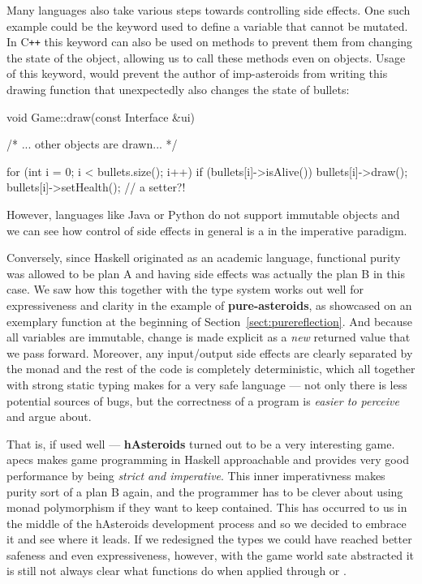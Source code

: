 \documentclass[
  digital, %
  color,   %
  table,   %
  oneside, %
  lof,     %
  lot,     %
]{fithesis3}
\newcommand{\cpp}{C\nolinebreak\texttt{+}\nolinebreak\texttt{+}}
\begin{document}
{Many languages also take various steps towards controlling side effects.
One such example could be the  keyword used to define a variable
that cannot be mutated. In \cpp{} this keyword can also be used on methods
to prevent them from changing the state of the object, allowing us to call these
methods even on  objects. Usage of this keyword, would prevent
the author of imp-asteroids from writing this drawing function that
unexpectedly also changes the state of bullets:
\begin{cppblock}
void Game::draw(const Interface &ui) {

    /* ... other objects are drawn... */
    
    for (int i = 0; i < bullets.size(); i++) {
        if (bullets[i]->isAlive()) {
            bullets[i]->draw();
            bullets[i]->setHealth(); // a setter?!
        }
    }
}
\end{cppblock}
However, languages like Java or Python do not support immutable objects
and we can see how control of side effects in general is a  in the imperative paradigm.

Conversely, since Haskell originated as an academic language,
functional purity was allowed to be plan A and having
side effects was actually the plan B in this case.
We saw how this together with the type system works out well for expressiveness and clarity
in the example of \textbf{pure-asteroids}, as showcased on an exemplary function
at the beginning of Section~\ref{sect:purereflection}.
And because all variables are immutable, change is made explicit as a \emph{new} returned value
that we pass forward.
Moreover, any input/output side effects are clearly separated by the  monad
and the rest of the code is completely deterministic, which all together with strong static typing
makes for a very safe language --- not only there is less potential sources of bugs, but the
correctness of a program is \emph{easier to perceive} and argue about.

That is, if used well --- \textbf{hAsteroids} turned out to be a very interesting game.
apecs makes game programming in Haskell approachable and provides
very good performance by being \emph{strict and imperative}. This inner imperativness
makes purity sort of a plan B again, and the programmer has to be clever about using monad polymorphism
if they want to keep  contained. This has occurred to us in the middle
of the hAsteroids development process and so we decided to embrace it and see where it leads.
If we redesigned the types we could have reached better safeness and even expressiveness, however,
with the game world sate abstracted it is still not always clear what functions do
when applied through  or .



}
\end{document}
